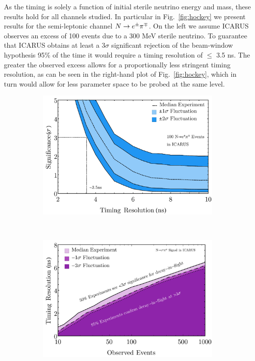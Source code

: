 \documentclass[11pt, a4paper]{article}
\newcommand{\reffig}[1]{Fig.~\ref{#1}}
\def\ster{\ensuremath N}
\begin{document}
As the timing is solely a function of initial sterile neutrino energy and
mass, these results hold for all channels studied. In particular in \reffig{fig:hockey} we present results for the semi-leptonic channel $\ster \rightarrow e^\pm \pi^\mp$.  On the left we assume ICARUS observes an excess of 100 events due to a 300 MeV sterile neutrino. To guarantee that ICARUS obtains at least a $3\sigma$
significant rejection of the beam-window hypothesis 95\% of the time it would require a timing resolution of $\leq$ 3.5 ns. The greater the observed
excess allows for a proportionally less stringent timing resolution, as can be seen in the right-hand plot of \reffig{fig:hockey}, which in turn would allow for less parameter space to be probed at the same level.

\begin{figure}[t]
\center
\begin{subfigure}[t]{0.5\textwidth}
\includegraphics[width=\textwidth]{figures/hockey_plot.pdf}
\end{subfigure}%
~
\begin{subfigure}[t]{0.5\textwidth}
\includegraphics[width=\textwidth]{figures/icarus_contour.pdf}

\end{subfigure}
\end{figure}
\end{document}
